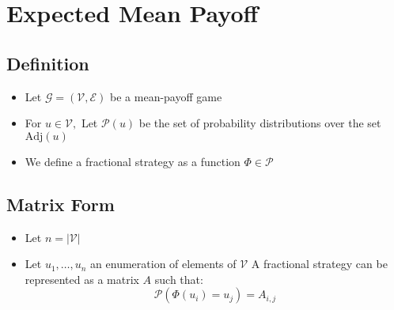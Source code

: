 \section{Expected Mean Payoff}
\subsection{Definition}
\begin{itemize}
	\item Let $\mathcal{G}=(\mathcal{V},\mathcal{E})$ be a mean-payoff game
	\item For $u\in\mathcal{V},$ Let $\mathscr{P}(u)$ be the set of probability distributions over the set $\text{Adj}(u)$
	\item We define a fractional strategy as a function $\Phi\in \mathscr{P}$

\end{itemize}


\subsection{Matrix Form}
\begin{itemize}
	\item Let $n=\lvert \mathcal{V}\rvert$
	\item Let $u_1,\dots,u_n$ an enumeration of elements of $\mathcal{V}$
	A fractional strategy can be represented as a matrix $A$ such that:
	$$
	\mathcal{P}(\Phi(u_i)=u_j)=A_{i,j}
	$$
\end{itemize}

